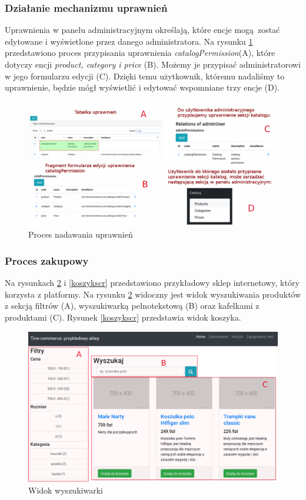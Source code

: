 \subsubsection{Działanie mechanizmu uprawnień}
Uprawnienia w panelu administracyjnym określają, które encje mogą zostać edytowane i wyświetlone przez danego administratora. Na rysunku \ref{uprawnienia} przedstawiono proces przypisania uprawnienia \textit{catalogPermission}(A), które dotyczy encji \textit{product, category i price} (B). Możemy je przypisać administratorowi w jego formularzu edycji (C). Dzięki temu użytkownik, któremu nadaliśmy to uprawnienie, będzie mógł wyświetlić i edytować wspomniane trzy encje (D). 
\begin{figure}
	\begin{center}
		\includegraphics[scale=0.4]{uprawnienia.png}
	\end{center}
	\caption{{\color{black}Proces nadawania uprawnień}} \label{uprawnienia}
\end{figure}

\subsubsection{Proces zakupowy}
Na rysunkach \ref{produktscr} i \ref{koszykscr} przedstawiono przykładowy sklep internetowy, który korzysta z platformy. Na rysunku \ref{produktscr} widoczny jest widok wyszukiwania produktów z sekcją filtrów (A), wyszukiwarką pełnotekstową (B) oraz kafelkami z produktami (C). Rysunek \ref{koszykscr} przedstawia widok koszyka.
\begin{figure}
	\begin{center}
		\includegraphics[scale=0.4]{produktu.png}
	\end{center}
	\caption{{\color{black}Widok wyszukiwarki}} \label{produktscr}
\end{figure}

